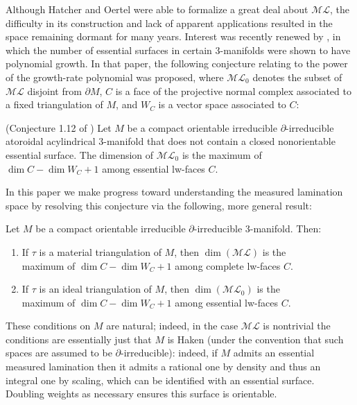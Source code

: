 \documentclass[12pt]{article}
\newcommand{\del}{\partial}
\newcommand{\ML}{\mathcal{ML}}
\theoremstyle{nonumberdefinition}
\theoremstyle{empty}
\theoremstyle{empty}
\begin{document}
Although Hatcher and Oertel were able to formalize a great deal about $\ML$, the difficulty in its construction and lack of apparent applications resulted in the space remaining dormant for many years. Interest was recently renewed by \cite{dunfieldCountingEssentialSurfaces2022}, in which the number of essential surfaces in certain $3$-manifolds were shown to have polynomial growth. In that paper, the following conjecture relating to the power of the growth-rate polynomial was proposed, where $\ML_0$ denotes the subset of $\ML$ disjoint from $\del M$, $C$ is a face of the projective normal complex associated to a fixed triangulation of $M$, and $W_C$ is a vector space associated to $C$:
{
\begin{reference}{(Conjecture 1.12 of \cite{dunfieldCountingEssentialSurfaces2022})}
Let $M$ be a compact orientable irreducible $\del$-irreducible atoroidal acylindrical 3-manifold that does not contain a closed nonorientable essential surface. The dimension of $\ML_0$ is the maximum of $\dim C - \dim W_C + 1$ among essential lw-faces $C$.
\end{reference}
}
In this paper we make progress toward understanding the measured lamination space by resolving this conjecture via the following, more general result:
{
\begin{reference}
Let $M$ be a compact orientable irreducible $\del$-irreducible 3-manifold. Then:
	{
	\begin{enumerate}[itemsep=0cm,leftmargin=2em,font=\upshape]
		\item If $\tau$ is a material triangulation of $M$, then $\dim( \ML)$ is the \\maximum of $\dim C - \dim W_C + 1$ among complete lw-faces $C$.
		\item If $\tau$ is an ideal triangulation of $M$, then $\dim( \ML_0)$ is the \\maximum of $\dim C - \dim W_C + 1$ among essential lw-faces $C$.
	\end{enumerate}}
\end{reference}
}

These conditions on $M$ are natural; indeed, in the case $\ML$ is nontrivial the conditions are essentially just that $M$ is Haken (under the convention that such spaces are assumed to be $\del$-irreducible): indeed, if $M$ admits an essential measured lamination then it admits a rational one by density and thus an integral one by scaling, which can be identified with an essential surface. Doubling weights as necessary ensures this surface is orientable.
\end{document}
